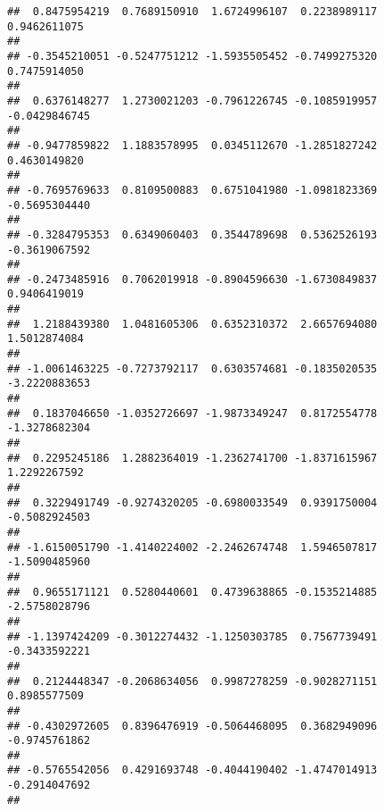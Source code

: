 \documentclass[]{article}
\begin{document}
\begin{verbatim}
##  0.8475954219  0.7689150910  1.6724996107  0.2238989117  0.9462611075 
##                                                                       
## -0.3545210051 -0.5247751212 -1.5935505452 -0.7499275320  0.7475914050 
##                                                                       
##  0.6376148277  1.2730021203 -0.7961226745 -0.1085919957 -0.0429846745 
##                                                                       
## -0.9477859822  1.1883578995  0.0345112670 -1.2851827242  0.4630149820 
##                                                                       
## -0.7695769633  0.8109500883  0.6751041980 -1.0981823369 -0.5695304440 
##                                                                       
## -0.3284795353  0.6349060403  0.3544789698  0.5362526193 -0.3619067592 
##                                                                       
## -0.2473485916  0.7062019918 -0.8904596630 -1.6730849837  0.9406419019 
##                                                                       
##  1.2188439380  1.0481605306  0.6352310372  2.6657694080  1.5012874084 
##                                                                       
## -1.0061463225 -0.7273792117  0.6303574681 -0.1835020535 -3.2220883653 
##                                                                       
##  0.1837046650 -1.0352726697 -1.9873349247  0.8172554778 -1.3278682304 
##                                                                       
##  0.2295245186  1.2882364019 -1.2362741700 -1.8371615967  1.2292267592 
##                                                                       
##  0.3229491749 -0.9274320205 -0.6980033549  0.9391750004 -0.5082924503 
##                                                                       
## -1.6150051790 -1.4140224002 -2.2462674748  1.5946507817 -1.5090485960 
##                                                                       
##  0.9655171121  0.5280440601  0.4739638865 -0.1535214885 -2.5758028796 
##                                                                       
## -1.1397424209 -0.3012274432 -1.1250303785  0.7567739491 -0.3433592221 
##                                                                       
##  0.2124448347 -0.2068634056  0.9987278259 -0.9028271151  0.8985577509 
##                                                                       
## -0.4302972605  0.8396476919 -0.5064468095  0.3682949096 -0.9745761862 
##                                                                       
## -0.5765542056  0.4291693748 -0.4044190402 -1.4747014913 -0.2914047692 
##                                                                       

\end{verbatim}
\end{document}
